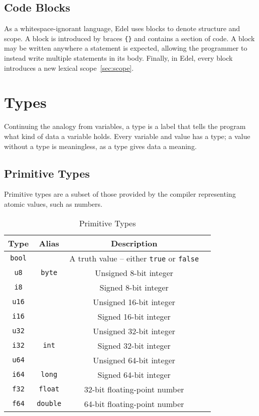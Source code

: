 \documentclass{article}
\begin{document}
    \subsection{Code Blocks}\label{subsec:code-blocks}

    As a whitespace-ignorant language, Edel uses blocks to denote structure and scope.
    A block is introduced by braces \texttt{\{\}} and contains a section of code.
    A block may be written anywhere a statement is expected, allowing the programmer to instead write multiple statements in its body.
    Finally, in Edel, every block introduces a new lexical scope~\ref{sec:scope}.

    \section{Types}\label{sec:types}

    Continuing the analogy from variables, a type is a label that tells the program what kind of data a variable holds.
    Every variable and value has a type; a value without a type is meaningless, as a type gives data a meaning.

    \subsection{Primitive Types}

    Primitive types are a subset of those provided by the compiler representing atomic values, such as numbers.

    \medskip
    \begin{table}[H]
        \begin{tabular}{|c|c|c|l|}
            \hline
            \textbf{Type} & \textbf{Alias} & \textbf{Description} \\
            \hline
            \texttt{bool} & & A truth value -- either \texttt{true} or \texttt{false} \\
            \hline
            \texttt{u8} & \texttt{byte} & Unsigned 8-bit integer \\
            \texttt{i8} & & Signed 8-bit integer \\
            \hline
            \texttt{u16} & & Unsigned 16-bit integer \\
            \texttt{i16} & & Signed 16-bit integer \\
            \hline
            \texttt{u32} & & Unsigned 32-bit integer \\
            \texttt{i32} & \texttt{int} & Signed 32-bit integer \\
            \hline
            \texttt{u64} & & Unsigned 64-bit integer \\
            \texttt{i64} & \texttt{long} & Signed 64-bit integer \\
            \hline
            \texttt{f32} & \texttt{float} & 32-bit floating-point number \\
            \texttt{f64} & \texttt{double} & 64-bit floating-point number \\
            \hline
        \end{tabular}
        \caption{Primitive Types}\label{tab:primitive-types}
    \end{table}
\end{document}
